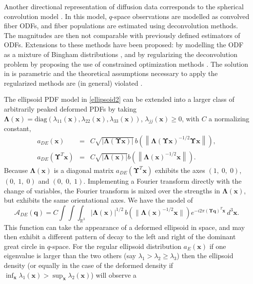 \documentclass[dvips,aoas,preprint]{imsart}
\numberwithin{equation}{section}
\theoremstyle{plain}
\newcommand{\q}{\mathbf{q}}
\newcommand{\x}{\mathbf{x}}
\newcommand{\cA}{\mathcal{A}}
\newcommand{\bs}[1]{\boldsymbol{#1}}
\begin{document}
Another directional representation of diffusion data corresponds to
the spherical convolution model \citep{Tournier}.  In this model,
$q$-space observations are modelled as convolved fiber ODFs, and fiber
populations are estimated using deconvolution methods. The magnitudes
are then not comparable with previously defined estimators of ODFs.
Extensions to these methods have been proposed: by modelling the ODF
as a mixture of Bingham distributions \citep{Kaden2007}, and by
regularizing the deconvolution problem by proposing the use of
constrained optimization methods \citep{Jian2007}.  The solution in
\citet{Kaden2007} is parametric and the theoretical assumptions
necessary to apply the regularized methods are (in general) violated
\citep{Jian2007}.

The ellipsoid PDF model in \eqref{ellipsoid2} can be extended into a
larger class of arbitrarily peaked deformed PDFs by taking
$\bm{\Lambda}(\x)={\text{diag}}(\lambda_{11}(\x),\lambda_{22}(\x),\lambda_{33}(\x))$,
$\lambda_{jj}(\x)\ge0$, with $C$ a normalizing constant,
\begin{eqnarray}%
  a_{DE}(\x) &=& C \sqrt{|\bs{\Lambda}(\bs{\Upsilon}\x)|} \,
  b\left(\left\|\bs{\Lambda}(\bs{\Upsilon}\x)^{-1/2}
  \bs{\Upsilon}\x\right\|\right),\\ 
  a_{DE}(\bs{\Upsilon}^T\x) &=& C \sqrt{|\bs{\Lambda}(\x)|}
  b\left(\left\|\bs{\Lambda}(\x)^{-1/2}\x\right\|\right).
\end{eqnarray}
Because $\bs{\Lambda}(\x)$ is a diagonal matrix
$a_{DE}(\bs{\Upsilon}^T\x)$ exhibits the axes $(1,\;0,\;0)$,
$(0,\;1,\;0)$ and $(0,\;0,\;1)$.  Implementing a Fourier transform
directly with the change of variables, the Fourier transform is mixed
over the strengths in $\bs{\Lambda}(\x)$, but exhibits the same
orientational axes.  We have the model of
\begin{equation}\label{deformedell}
  {\cA}_{DE}(\q) = C \int\int\int_{\mathbb{R}^3}
  |\bs{\Lambda}(\x)|^{1/2} \,
  b\left(\|\bs{\Lambda}(\x)^{-1/2}\x\|\right)
  e^{-i2\pi(\bs{\Upsilon}\q)^T\x} \, d^3\x.
\end{equation}
This function can take the appearance of a deformed ellipsoid in
space, and may then exhibit a different pattern of decay to the left
and right of the dominant great circle in $q$-space.  For the regular
ellipsoid distribution $a_E(\x)$ if one eigenvalue is larger than the
two others (say $\lambda_1>\lambda_2\ge\lambda_3$) then the ellipsoid
density (or equally in the case of the deformed density if
$\inf_{\x}\lambda_1(\x)>\sup_{\x}\lambda_2(\x)$) will observe a
\end{document}
